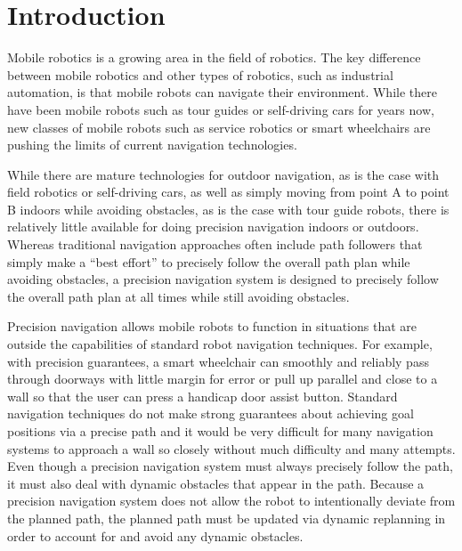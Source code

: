 \section{Introduction}\label{sec:introduction}

Mobile robotics is a growing area in the field of robotics. The key difference between mobile robotics and other types of robotics, such as industrial automation, is that mobile robots can navigate their environment. While there have been mobile robots such as tour guides or self-driving cars for years now, new classes of mobile robots such as service robotics or smart wheelchairs are pushing the limits of current navigation technologies.

While there are mature technologies for outdoor navigation, as is the case with field robotics or self-driving cars, as well as simply moving from point A to point B indoors while avoiding obstacles, as is the case with tour guide robots, there is relatively little available for doing precision navigation indoors or outdoors. Whereas traditional navigation approaches often include path followers that simply make a ``best effort'' to precisely follow the overall path plan while avoiding obstacles, a precision navigation system is designed to precisely follow the overall path plan at all times while still avoiding obstacles.

Precision navigation allows mobile robots to function in situations that are outside the capabilities of standard robot navigation techniques. For example, with precision guarantees, a smart wheelchair can smoothly and reliably pass through doorways with little margin for error or pull up parallel and close to a wall so that the user can press a handicap door assist button. Standard navigation techniques do not make strong guarantees about achieving goal positions via a precise path and it would be very difficult for many navigation systems to approach a wall so closely without much difficulty and many attempts. Even though a precision navigation system must always precisely follow the path, it must also deal with dynamic obstacles that appear in the path. Because a precision navigation system does not allow the robot to intentionally deviate from the planned path, the planned path must be updated via dynamic replanning in order to account for and avoid any dynamic obstacles.

